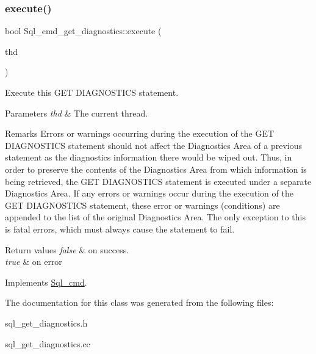 \subsubsection{\texorpdfstring{execute()}{execute()}}
{\footnotesize\ttfamily bool Sql\+\_\+cmd\+\_\+get\+\_\+diagnostics\+::execute (\begin{DoxyParamCaption}\item[{T\+HD $\ast$}]{thd }\end{DoxyParamCaption})\hspace{0.3cm}{\ttfamily [virtual]}}

Execute this G\+ET D\+I\+A\+G\+N\+O\+S\+T\+I\+CS statement.


\begin{DoxyParams}{Parameters}
{\em thd} & The current thread.\\
\hline
\end{DoxyParams}
\begin{DoxyRemark}{Remarks}
Errors or warnings occurring during the execution of the G\+ET D\+I\+A\+G\+N\+O\+S\+T\+I\+CS statement should not affect the Diagnostics Area of a previous statement as the diagnostics information there would be wiped out. Thus, in order to preserve the contents of the Diagnostics Area from which information is being retrieved, the G\+ET D\+I\+A\+G\+N\+O\+S\+T\+I\+CS statement is executed under a separate Diagnostics Area. If any errors or warnings occur during the execution of the G\+ET D\+I\+A\+G\+N\+O\+S\+T\+I\+CS statement, these error or warnings (conditions) are appended to the list of the original Diagnostics Area. The only exception to this is fatal errors, which must always cause the statement to fail.
\end{DoxyRemark}

\begin{DoxyRetVals}{Return values}
{\em false} & on success. \\
\hline
{\em true} & on error \\
\hline
\end{DoxyRetVals}


Implements \mbox{\hyperlink{classSql__cmd_a213367b79b551296fbb7790f2a3732fb}{Sql\+\_\+cmd}}.



The documentation for this class was generated from the following files\+:\begin{DoxyCompactItemize}
\item 
sql\+\_\+get\+\_\+diagnostics.\+h\item 
sql\+\_\+get\+\_\+diagnostics.\+cc\end{DoxyCompactItemize}
